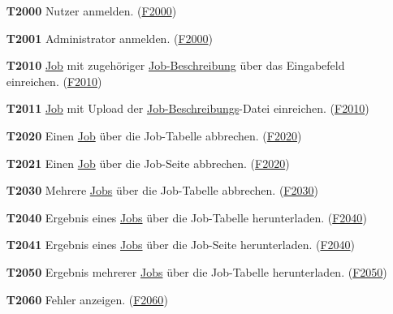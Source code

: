 \begin{itemize}
    \item[\textbf{T2000}] \gls{Nutzer} anmelden. (\hyperref[FA:Web-Interface:Anmelden]{F2000})
    
    \item[\textbf{T2001}] \gls{Administrator} anmelden. (\hyperref[FA:Web-Interface:Anmelden]{F2000})
    
    \item[\textbf{T2010}] \hyperref[B:Jobs]{Job} mit zugehöriger \hyperref[B:Job-Beschreibung]{Job-Beschreibung} über das Eingabefeld einreichen. (\hyperref[FA:Web-Interface:Job einreichen]{F2010})
    
    \item[\textbf{T2011}] \hyperref[B:Jobs]{Job} mit Upload der \hyperref[B:Job-Beschreibung]{Job-Beschreibungs}-Datei einreichen. (\hyperref[FA:Web-Interface:Job einreichen]{F2010})
    
    \item[\textbf{T2020}] Einen \hyperref[B:Jobs]{Job} über die Job-Tabelle abbrechen. (\hyperref[FA:Web-Interface:Abbruch eines einzelnen Jobs]{F2020})
    
    \item[\textbf{T2021}] Einen \hyperref[B:Jobs]{Job} über die Job-Seite abbrechen. (\hyperref[FA:Web-Interface:Abbruch eines einzelnen Jobs]{F2020})
    
    \item[\textbf{T2030}] Mehrere \hyperref[B:Jobs]{Jobs} über die Job-Tabelle abbrechen. (\hyperref[FA:Web-Interface:Abbruch mehrerer Jobs auf einmal]{F2030})
    
    \item[\textbf{T2040}] Ergebnis eines \hyperref[B:Jobs]{Jobs} über die Job-Tabelle herunterladen. (\hyperref[FA:Web-Interface:Herunterladen eines einzelnen Ergebnisses]{F2040})
    
    \item[\textbf{T2041}] Ergebnis eines \hyperref[B:Jobs]{Jobs} über die Job-Seite herunterladen. (\hyperref[FA:Web-Interface:Herunterladen eines einzelnen Ergebnisses]{F2040})
    
    \item[\textbf{T2050}] Ergebnis mehrerer \hyperref[B:Jobs]{Jobs} über die Job-Tabelle herunterladen. (\hyperref[FA:Web-Interface:herunterladen mehrerer Ergebnisse auf einmal]{F2050})
    
    \item[\textbf{T2060}] Fehler anzeigen. (\hyperref[FA:Web-Interface:Anzeigen von Fehlern]{F2060})
    

\end{itemize}
